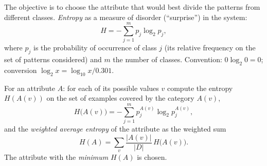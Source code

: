 \documentclass[11pt,a4paper]{article}
\theoremstyle{definition}
\providecommand{\uv}[1]{``#1''}
\begin{document}
\begin{defbox}
The objective is to choose the attribute that would best divide the patterns from different
classes. \emph{Entropy} as a measure of disorder (\uv{surprise}) in the system:
\[ H=-\sum_{j=1}^{m}p_j\log_2 p_j, \]
where $p_j$ is the probability of occurrence of class $j$ (its relative frequency on the set of
patterns considered) and $m$ the number of classes. Convention: $0\log_2 0=0$; conversion
$\log_2 x=\log_{10}x/0.301$.

For an attribute $A$: for each of its possible values $v$ compute the entropy $H(A(v))$ on the
set of examples covered by the category $A(v)$,
\[ H\big(A(v)\big)=-\sum_{j=1}^{m}p_j^{A(v)}\log_2 p_j^{A(v)}, \]
and the \emph{weighted average entropy} of the attribute as the weighted sum
\[ H(A)=\sum_{v}\frac{|A(v)|}{|D|}\,H\big(A(v)\big). \]
The attribute with the \emph{minimum} $H(A)$ is chosen.
\end{defbox}
\end{document}
